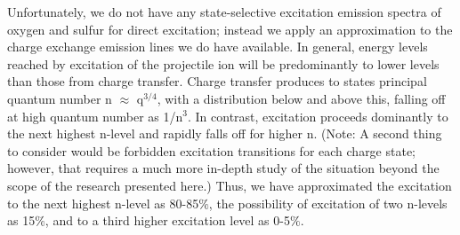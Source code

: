 \documentclass[draft]{agujournal2018}
\begin{document}
Unfortunately, we do not have any state-selective excitation emission spectra of oxygen and sulfur for direct excitation; instead we apply an approximation to the charge exchange emission lines we do have available.
In general, energy levels reached by excitation of the projectile ion will be predominantly to lower levels than those from charge transfer.
Charge transfer produces to states principal quantum number n $\approx$ q$^{3/4}$, with a distribution below and above this, falling off at high quantum number as 1/n$^3$.
In contrast, excitation proceeds dominantly to the next highest n-level and rapidly falls off for higher n.
(Note: A second thing to consider would be forbidden excitation transitions for each charge state; however, that requires a much more in-depth study of the situation beyond the scope of the research presented here.)
Thus, we have approximated the excitation to the next highest n-level as 80-85$\%$, the possibility of excitation of two n-levels as 15$\%$, and to a third higher excitation level as 0-5$\%$.

\end{document}
